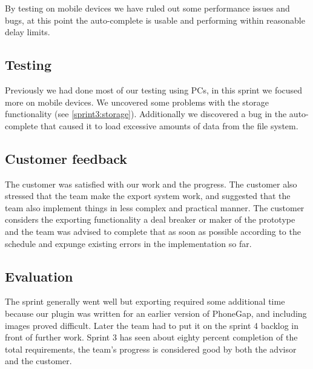 \label{Auto-complete}

By testing on mobile devices we have ruled out some performance issues and bugs,
at this point the auto-complete is usable and performing within reasonable delay limits.

\subsection{Testing}

Previously we had done most of our testing using PCs, in this sprint we
focused more on mobile devices. We uncovered some problems with the
storage functionality (see \ref{sprint3:storage}). Additionally we discovered
a bug in the auto-complete that caused it to load excessive amounts of data from
the file system.

\subsection{Customer feedback}

The customer was satisfied with our work and the progress. The customer
also stressed that the team make the export system work, and suggested that
the team also implement things in less complex and practical manner. The
customer considers the exporting functionality a deal breaker or maker of
the prototype and the team was advised to complete that as soon as possible
according to the schedule and expunge existing errors in the implementation
so far.

\subsection{Evaluation}

The sprint generally went well but exporting required some additional time because our plugin was 
written for an earlier version of PhoneGap, and including images proved difficult. 
Later the team had to put it on the sprint 4 backlog in front of further work.
Sprint 3 has seen about eighty percent completion of the total requirements, 
the team's progress is considered good by both the advisor and the customer.
